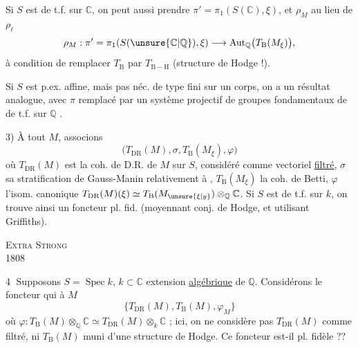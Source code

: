 Si $S$ est  de t.f. sur $\mathbb C$, on peut aussi prendre $\pi'=\pi_1(S(\mathbb C),\xi)$, et $\rho_M$ au lieu de $\rho_\ell$
\[
\rho_M:\pi'=\pi_1(S(\unsure{\mathbb C|\mathbb Q}),\xi)\longrightarrow\operatorname{Aut}_{\mathbb Q}\bigl(T_{\mathrm B}(M_\xi)\bigr),
\]
à condition de remplacer $T_{\mathrm B}$ par $T_{\mathrm{B-H}}$ (structure de Hodge !).

Si $S$ est p.ex. affine,  mais pas néc. de type fini sur un corps, on a un résultat analogue, avec $\pi$ remplacé par un système projectif de groupes fondamentaux de  de t.f. sur $\mathbb Q$ .

3) À tout $M$, associons
\[
\bigl(T_{\mathrm{DR}}(M),\sigma,T_{\mathrm B}(M_\xi),\varphi\bigr)
\]
où $T_{\mathrm{DR}}(M)$ est la coh. de D.R. de $M$ sur $S$, considéré comme vectoriel \uline{filtré}, $\sigma$ sa stratification de Gauss-Manin relativement à , $T_{\mathrm B}(M_\xi)$ la coh. de Betti,
$\varphi$ l'isom. canonique $T_{\mathrm{DR}}(M)(\xi)\simeq T_{\mathrm B}(M_{\unsure{\xi|y}})\otimes_{\mathbb Q}\mathbb C$. Si $S$ est de t.f. sur $k$, on trouve ainsi un foncteur pl. fid. (moyennant conj. de Hodge, et utilisant Griffiths).
\par\noindent\textsc{Extra Strong}\\
 1808

\textcircled{4}  Supposons $S=\operatorname{Spec}k$, $k\subset\mathbb C$ extension \uline{algébrique} de $\mathbb Q$. Considérons le foncteur qui à $M$ 
\begingroup\makeatletter\tagsleft@true\makeatother
\[
\bigl\{T_{\mathrm{DR}}(M),T_{\mathrm B}(M),\varphi_M\bigr\} \tag*{(4.1)}
\]
\endgroup
où $\varphi:T_{\mathrm B}(M)\otimes_{\mathbb Q}\mathbb C\simeq T_{\mathrm{DR}}(M)\otimes_k\mathbb C$ ; ici, on ne considère pas $T_{\mathrm{DR}}(M)$ comme filtré,  ni $T_{\mathrm B}(M)$ muni d'une structure de Hodge. Ce foncteur est-il pl. fidèle ??

